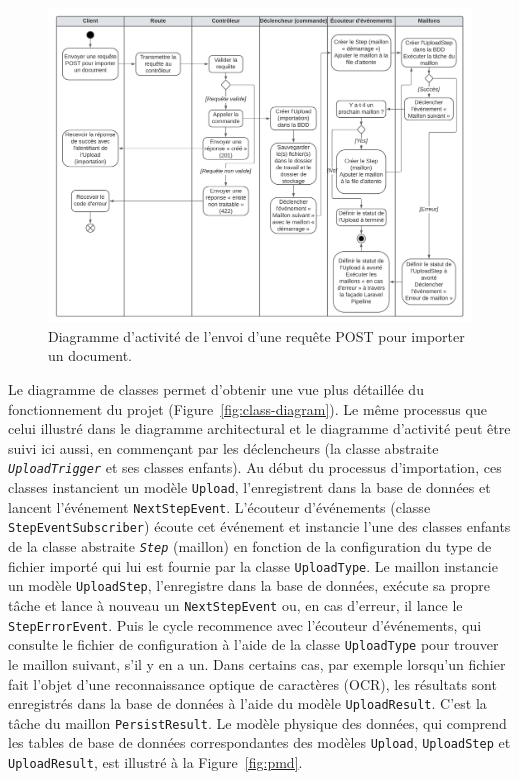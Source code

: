 \begin{figure}
    \centering
    \includegraphics[width=\textwidth]{img/import-activity-diagram}
    \caption{Diagramme d'activité de l'envoi d'une requête POST pour importer un document.}
    \label{fig:import-activity-diagram}
\end{figure}

Le diagramme de classes permet d'obtenir une vue plus détaillée du fonctionnement du projet (Figure~\ref{fig:class-diagram}). Le même processus que celui illustré dans le diagramme architectural et le diagramme d'activité peut être suivi ici aussi, en commençant par les déclencheurs (la classe abstraite \emph{\Verb|UploadTrigger|} et ses classes enfants). Au début du processus d'importation, ces classes instancient un modèle \Verb|Upload|, l'enregistrent dans la base de données et lancent l'événement \Verb|NextStepEvent|. L'écouteur d'événements (classe \Verb|StepEventSubscriber|) écoute cet événement et instancie l'une des classes enfants de la classe abstraite \emph{\Verb|Step|} (maillon) en fonction de la configuration du type de fichier importé qui lui est fournie par la classe \Verb|UploadType|. Le maillon instancie un modèle \Verb|UploadStep|, l'enregistre dans la base de données, exécute sa propre tâche et lance à nouveau un \Verb|NextStepEvent| ou, en cas d'erreur, il lance le \Verb|StepErrorEvent|. Puis le cycle recommence avec l'écouteur d'événements, qui consulte le fichier de configuration à l'aide de la classe \Verb|UploadType| pour trouver le maillon suivant, s'il y en a un. Dans certains cas, par exemple lorsqu'un fichier fait l'objet d'une reconnaissance optique de caractères (OCR), les résultats sont enregistrés dans la base de données à l'aide du modèle \Verb|UploadResult|. C'est la tâche du maillon \Verb|PersistResult|. Le modèle physique des données, qui comprend les tables de base de données correspondantes des modèles \Verb|Upload|, \Verb|UploadStep| et \Verb|UploadResult|, est illustré à la Figure~\ref{fig:pmd}.


